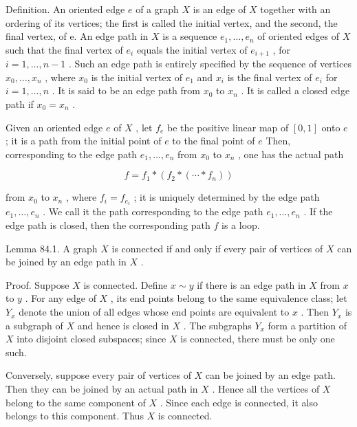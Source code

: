 \documentclass[10pt]{article}
\begin{document}
Definition. An oriented edge \(e\) of a graph \(X\) is an edge of \(X\) together with an ordering of its vertices; the first is called the initial vertex, and the second, the final vertex, of e. An edge path in \(X\) is a sequence \({e}_{1},\ldots ,{e}_{n}\) of oriented edges of \(X\) such that the final vertex of \({e}_{i}\) equals the initial vertex of \({e}_{i + 1}\) , for \(i = 1,\ldots ,n - 1\) . Such an edge path is entirely specified by the sequence of vertices \({x}_{0},\ldots ,{x}_{n}\) , where \({x}_{0}\) is the initial vertex of \({e}_{1}\) and \({x}_{i}\) is the final vertex of \({e}_{i}\) for \(i = 1,\ldots ,n\) . It is said to be an edge path from \({x}_{0}\) to \({x}_{n}\) . It is called a closed edge path if \({x}_{0} = {x}_{n}\) .

Given an oriented edge \(e\) of \(X\) , let \({f}_{e}\) be the positive linear map of \(\left\lbrack  {0,1}\right\rbrack\) onto \(e\) ; it is a path from the initial point of \(e\) to the final point of \(e\) Then, corresponding to the edge path \({e}_{1},\ldots ,{e}_{n}\) from \({x}_{0}\) to \({x}_{n}\) , one has the actual path

\[
f = {f}_{1} * \left( {{f}_{2} * \left( {\cdots  * {f}_{n}}\right) }\right)
\]

from \({x}_{0}\) to \({x}_{n}\) , where \({f}_{i} = {f}_{{e}_{i}}\) ; it is uniquely determined by the edge path \({e}_{1},\ldots ,{e}_{n}\) . We call it the path corresponding to the edge path \({e}_{1},\ldots ,{e}_{n}\) . If the edge path is closed, then the corresponding path \(f\) is a loop.

Lemma 84.1. A graph \(X\) is connected if and only if every pair of vertices of \(X\) can be joined by an edge path in \(X\) .

Proof. Suppose \(X\) is connected. Define \(x \sim  y\) if there is an edge path in \(X\) from \(x\) to \(y\) . For any edge of \(X\) , its end points belong to the same equivalence class; let \({Y}_{x}\) denote the union of all edges whose end points are equivalent to \(x\) . Then \({Y}_{x}\) is a subgraph of \(X\) and hence is closed in \(X\) . The subgraphs \({Y}_{x}\) form a partition of \(X\) into disjoint closed subspaces; since \(X\) is connected, there must be only one such.

Conversely, suppose every pair of vertices of \(X\) can be joined by an edge path. Then they can be joined by an actual path in \(X\) . Hence all the vertices of \(X\) belong to the same component of \(X\) . Since each edge is connected, it also belongs to this component. Thus \(X\) is connected.
\end{document}
